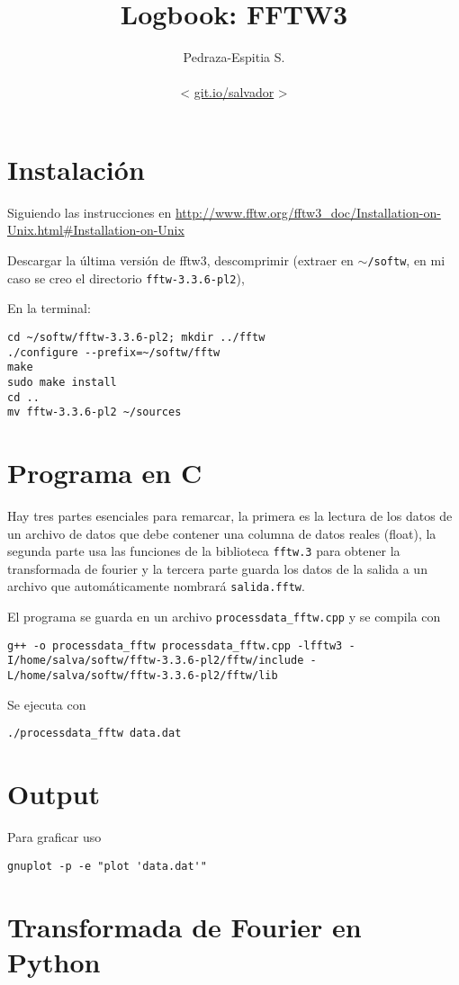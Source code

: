 \documentclass[letterpaper,11pt]{article}
\title{Logbook:  FFTW3}
\author{Pedraza-Espitia S.\\ \\< \url{git.io/salvador} >}
\date{}
\begin{document}
\maketitle
{}

%
%
\section{Instalación}
Siguiendo las instrucciones en \url{http://www.fftw.org/fftw3_doc/Installation-on-Unix.html#Installation-on-Unix}

Descargar la última versión de fftw3, descomprimir (extraer en $\sim$\verb|/softw|, en mi caso se creo el directorio \verb|fftw-3.3.6-pl2|), 

En la terminal:
\begin{lstlisting}
cd ~/softw/fftw-3.3.6-pl2; mkdir ../fftw
./configure --prefix=~/softw/fftw
make
sudo make install
cd ..
mv fftw-3.3.6-pl2 ~/sources
\end{lstlisting}

\section{Programa en C}
Hay tres partes esenciales para remarcar, la primera es la lectura de los datos de un archivo de datos que debe contener una columna de datos reales (float), la segunda parte usa las funciones de la biblioteca \verb|fftw.3| para obtener la transformada de fourier y la tercera parte guarda los datos de la salida a un archivo que automáticamente nombrará \verb|salida.fftw|.


El programa se guarda en un archivo \verb|processdata_fftw.cpp| y se compila con\\
\begin{lstlisting}
g++ -o processdata_fftw processdata_fftw.cpp -lfftw3 -I/home/salva/softw/fftw-3.3.6-pl2/fftw/include -L/home/salva/softw/fftw-3.3.6-pl2/fftw/lib
\end{lstlisting}

Se ejecuta con
\begin{lstlisting}
./processdata_fftw data.dat
\end{lstlisting}
\section{Output}
\label{sec:output}
Para graficar uso
\begin{lstlisting}
gnuplot -p -e "plot 'data.dat'"
\end{lstlisting}

\section{Transformada de Fourier en Python}
\label{sec:TFP}




\end{document}
